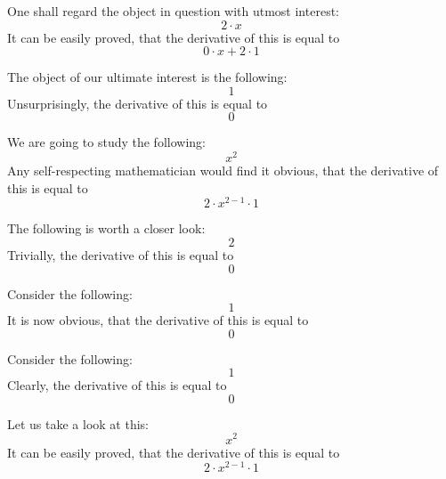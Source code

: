 \documentclass{article}
\begin{document}
One shall regard the object in question with utmost interest:
\begin{equation}
2 \cdot x 
\end{equation}
It can be easily proved, that the derivative of this is equal to
\begin{equation}
0 \cdot x + 2 \cdot 1 
\end{equation}

The object of our ultimate interest is the following:
\begin{equation}
1 
\end{equation}
Unsurprisingly, the derivative of this is equal to
\begin{equation}
0 
\end{equation}

We are going to study the following:
\begin{equation}
x ^{2 } 
\end{equation}
Any self-respecting mathematician would find it obvious, that the derivative of this is equal to
\begin{equation}
2 \cdot x ^{2 - 1 } \cdot 1 
\end{equation}

The following is worth a closer look:
\begin{equation}
2 
\end{equation}
Trivially, the derivative of this is equal to
\begin{equation}
0 
\end{equation}

Consider the following:
\begin{equation}
1 
\end{equation}
It is now obvious, that the derivative of this is equal to
\begin{equation}
0 
\end{equation}

Consider the following:
\begin{equation}
1 
\end{equation}
Clearly, the derivative of this is equal to
\begin{equation}
0 
\end{equation}

Let us take a look at this:
\begin{equation}
x ^{2 } 
\end{equation}
It can be easily proved, that the derivative of this is equal to
\begin{equation}
2 \cdot x ^{2 - 1 } \cdot 1 
\end{equation}
\end{document}
